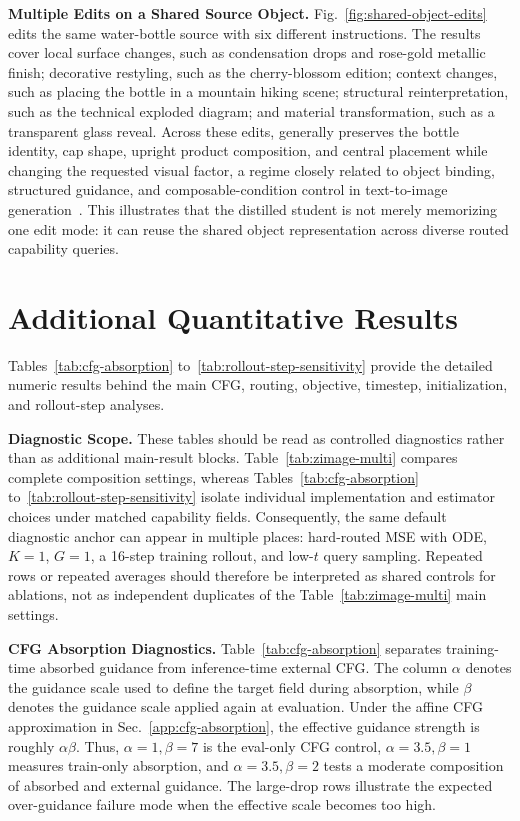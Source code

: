 \noindent\textbf{Multiple Edits on a Shared Source Object.}
Fig.~\ref{fig:shared-object-edits} edits the same water-bottle source with six different instructions. The results cover local surface changes, such as condensation drops and rose-gold metallic finish; decorative restyling, such as the cherry-blossom edition; context changes, such as placing the bottle in a mountain hiking scene; structural reinterpretation, such as the technical exploded diagram; and material transformation, such as a transparent glass reveal. Across these edits, \name{} generally preserves the bottle identity, cap shape, upright product composition, and central placement while changing the requested visual factor, a regime closely related to object binding, structured guidance, and composable-condition control in text-to-image generation~\cite{chefer2023attend,feng2022training,huang2023composer}. This illustrates that the distilled student is not merely memorizing one edit mode: it can reuse the shared object representation across diverse routed capability queries.


\vspace{0.2cm}


\section{Additional Quantitative Results}
\label{app:detailed-results}

Tables~\ref{tab:cfg-absorption} to~\ref{tab:rollout-step-sensitivity} provide the detailed numeric results behind the main CFG, routing, objective, timestep, initialization, and rollout-step analyses.

\noindent\textbf{Diagnostic Scope.}
These tables should be read as controlled diagnostics rather than as additional main-result blocks. Table~\ref{tab:zimage-multi} compares complete composition settings, whereas Tables~\ref{tab:cfg-absorption} to~\ref{tab:rollout-step-sensitivity} isolate individual implementation and estimator choices under matched capability fields. Consequently, the same default diagnostic anchor can appear in multiple places: hard-routed MSE with ODE, $K{=}1$, $G{=}1$, a 16-step training rollout, and low-$t$ query sampling. Repeated rows or repeated averages should therefore be interpreted as shared controls for ablations, not as independent duplicates of the Table~\ref{tab:zimage-multi} main settings.


\noindent\textbf{CFG Absorption Diagnostics.}
Table~\ref{tab:cfg-absorption} separates training-time absorbed guidance from inference-time external CFG. The column $\alpha$ denotes the guidance scale used to define the target field during absorption, while $\beta$ denotes the guidance scale applied again at evaluation. Under the affine CFG approximation in Sec.~\ref{app:cfg-absorption}, the effective guidance strength is roughly $\alpha\beta$. Thus, $\alpha{=}1,\beta{=}7$ is the eval-only CFG control, $\alpha{=}3.5,\beta{=}1$ measures train-only absorption, and $\alpha{=}3.5,\beta{=}2$ tests a moderate composition of absorbed and external guidance. The large-drop rows illustrate the expected over-guidance failure mode when the effective scale becomes too high.


